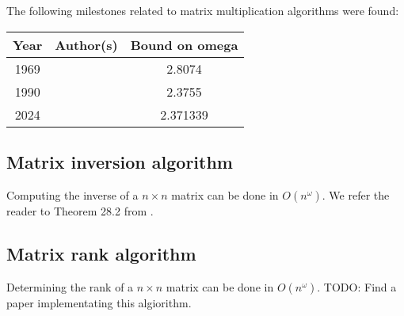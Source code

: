 \noindent
The following milestones related to matrix multiplication algorithms were found:
\begin{center}
  \begin{tabular}{|c|c|c|}
    \hline
    Year & Author(s) & Bound on omega \\
    \hline
    1969 & \citet{Strassen1969} & 2.8074 \\ 
    1990 & \citet{COPPERSMITH1990} & 2.3755 \\
    2024 & \citet{2024asymmetryyieldsfastermatrix} & 2.371339 \\
    \hline
  \end{tabular}
\end{center}

\subsection{Matrix inversion algorithm}

Computing the inverse of a \(n \times n\) matrix can be done in \(O(n^\omega)\). 
We refer the reader to Theorem 28.2 from \citet{CLRS}.

\subsection{Matrix rank algorithm}

Determining the rank of a \(n \times n\) matrix can be done in \(O(n^\omega)\).
TODO: Find a paper implementating this algiorithm.
